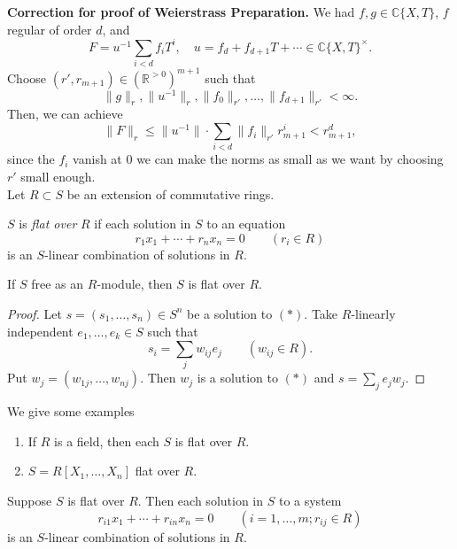 


\textbf{Correction for proof of Weierstrass Preparation.} We had $f, g\in \mathds{C}\{X, T\}$, $f$ regular of order $d$, and
$$F=u^{-1}\sum_{i<d}f_iT^i, \quad u=f_d + f_{d+1}T+ \cdots \in \mathds{C}\{X, T\}^\times.$$
Choose $(r', r_{m+1})\in (\mathds{R}^{>0})^{m+1}$ such that
$$\|g\|_r, \|u^{-1}\|_r, \|f_0\|_{r'}, \dots, \|f_{d+1}\|_{r'}<\infty.$$
Then, we can achieve
$$\|F\|_r\leq \|u^{-1}\|\cdot \sum_{i<d}\|f_i\|_{r'}r^i_{m+1}<r^d_{m+1},$$
since the $f_i$ vanish at $0$ we can make the norms as small as we want by choosing $r'$ small enough.\\

Let $R\subset S$ be an extension of commutative rings.

\begin{definition} $S$ is \textit{flat over} $R$ if each solution in $S$ to an equation
\begin{equation} r_1x_1+\cdots + r_n x_n=0 \qquad (r_i\in R) \tag{$*$}\end{equation}
is an $S$-linear combination of solutions in $R$. \end{definition}

\begin{lemma} If $S$ free as an $R$-module, then $S$ is flat over $R$. \end{lemma}

\begin{proof} Let $s=(s_1, \dots, s_n)\in S^n$ be a solution to $(*)$.  Take $R$-linearly independent $e_1, \dots, e_k\in S$ such that
$$s_i=\sum_j w_{ij} e_j \qquad (w_{ij}\in R).$$
Put $w_j=(w_{1j}, \dots, w_{nj})$.  Then $w_j$ is a solution to $(*)$ and $s=\sum_j e_jw_j.$
\end{proof}

We give some examples
\begin{enumerate}%
\item If $R$ is a field, then each $S$ is flat over $R$.  
\item $S=R[X_1, \dots, X_n]$ flat over $R$.
\end{enumerate}

\begin{lemma} Suppose $S$ is flat over $R$.  Then each solution in $S$ to a system
$$r_{i1}x_1 + \cdots + r_{in}x_n=0 \qquad (i=1, \dots, m ; r_{ij}\in R)$$
is an $S$-linear combination of solutions in $R$. \end{lemma}

